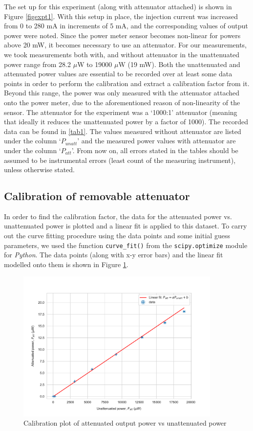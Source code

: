 The set up for this experiment (along with attenuator attached) is shown in Figure \ref{figexpt1}. With this setup in place, the injection current was increased from 0 to 280 mA in increments of 5 mA, and the corresponding values of output power were noted. Since the power meter sensor becomes non-linear for powers above 20 mW, it becomes necessary to use an attenuator. For our measurements, we took measurements both with, and without attenuator in the unattenuated power range from 28.2 $\mu$W to 19000 $\mu$W (19 mW). Both the unattenuated and attenuated power values are essential to be recorded over at least some data points in order to perform the calibration and extract a calibration factor from it. Beyond this range, the power was only measured with the attenuator attached onto the power meter, due to the aforementioned reason of non-linearity of the sensor. The attenuator for the experiment was a `1000:1' attenuator (meaning that ideally it reduces the unattenuated power by a factor of 1000). The recorded data can be found in \ref{tab1}. The values measured without attenuator are listed under the column `$P_{unatt}$' and the measured power values with attenuator are under the column `$P_{att}$'. From now on, all errors stated in the tables should be assumed to be instrumental errors (least count of the measuring instrument), unless otherwise stated.

\subsection{Calibration of removable attenuator}
\label{Calib}
In order to find the calibration factor, the data for the attenuated power vs. unattenuated power is plotted and a linear fit is applied to this dataset. To carry out the curve fitting procedure using the data points and some initial guess parameters, we used the function \texttt{curve\_fit()} from the \texttt{scipy.optimize} module for \textit{Python}. The data points (along with x-y error bars) and the linear fit modelled onto them is shown in Figure \ref{figexpt2}.

\begin{figure}[H]
\includegraphics[width=0.9\textwidth]{./imagesandplots/attvsunattcalib.pdf}
\centering
\caption{Calibration plot of attenuated output power vs unattenuated power}
\label{figexpt2}
\end{figure}

